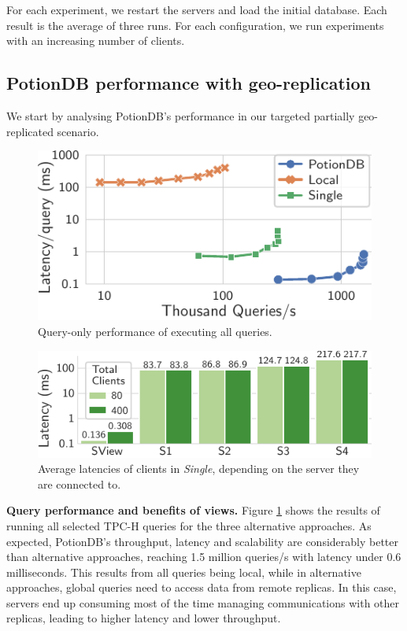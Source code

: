 \documentclass[sigplan,twocolumn,review,anonymous]{acmart}
\begin{document}
For each experiment, we restart the servers and load the initial database. 
Each result is the average of three runs. 
For each configuration, we run experiments with an increasing number of clients. 



\subsection{PotionDB performance with geo-replication}

We start by analysing PotionDB's performance in our targeted partially geo-replicated scenario.

\begin{figure}
	\centering
	\includegraphics[width=0.6\linewidth]{singleQuery/all_queries_tc}
	\vspace*{-0.75em}
	\caption{Query-only performance of executing all queries.}
	\label{fig:global_local_single_tc}
	\vspace*{-0.9em}
\end{figure}%
\begin{figure}
	\centering
	\includegraphics[width=0.72\linewidth]{singleQuery/single_TC_latencies}
	\vspace*{-0.6em}
	\caption{Average latencies of clients in \textit{Single}, depending on the server they are connected to.}
	\label{fig:single_tc_latencies}
	\vspace*{-1em}
\end{figure}%

\noindent
\textbf{Query performance and benefits of views.}
Figure \ref{fig:global_local_single_tc} shows the results of running all selected TPC-H queries for the three alternative approaches. 
As expected, PotionDB's throughput, latency and scalability are considerably better than alternative approaches, reaching 
1.5 million queries/s with latency under 0.6 milliseconds. 
This results from all queries being local, while in alternative approaches, global queries need to access data from 
remote replicas. In this case, servers end up consuming most of the time managing communications with other replicas, leading 
to higher latency 
and lower throughput. 
\end{document}
